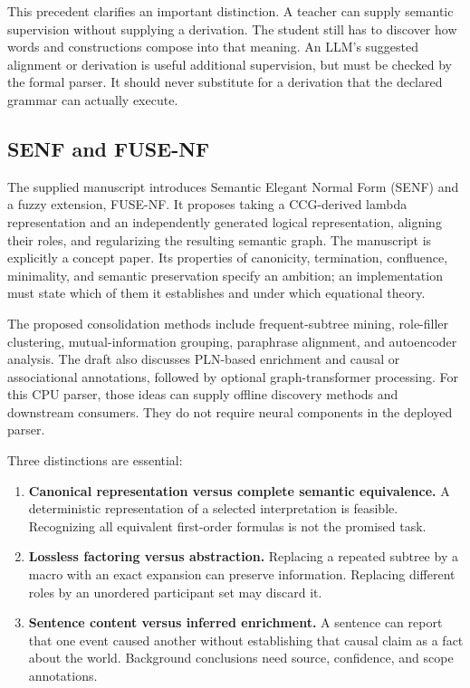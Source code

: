 \documentclass[11pt,a4paper]{article}
\begin{document}
This precedent clarifies an important distinction. A teacher can supply
semantic supervision without supplying a derivation. The student still has to
discover how words and constructions compose into that meaning. An LLM's
suggested alignment or derivation is useful additional supervision, but must
be checked by the formal parser. It should never substitute for a derivation
that the declared grammar can actually execute.

\subsection{SENF and FUSE-NF}
The supplied manuscript \cite{senf} introduces Semantic Elegant Normal Form
(SENF) and a fuzzy extension, FUSE-NF. It proposes taking a CCG-derived
lambda representation and an independently generated logical representation,
aligning their roles, and regularizing the resulting semantic graph.
The manuscript is explicitly a concept paper. Its properties of canonicity,
termination, confluence, minimality, and semantic preservation specify an
ambition; an implementation must state which of them it establishes and under
which equational theory.

The proposed consolidation methods include frequent-subtree mining,
role-filler clustering, mutual-information grouping, paraphrase alignment,
and autoencoder analysis. The draft also discusses PLN-based enrichment and
causal or associational annotations, followed by optional graph-transformer
processing. For this CPU parser, those ideas can supply offline discovery
methods and downstream consumers. They do not require neural components in
the deployed parser.

Three distinctions are essential:
\begin{enumerate}
  \item \textbf{Canonical representation versus complete semantic equivalence.}
  A deterministic representation of a selected interpretation is feasible.
  Recognizing all equivalent first-order formulas is not the promised task.
  \item \textbf{Lossless factoring versus abstraction.}
  Replacing a repeated subtree by a macro with an exact expansion can preserve
  information. Replacing different roles by an unordered participant set may
  discard it.
  \item \textbf{Sentence content versus inferred enrichment.}
  A sentence can report that one event caused another without establishing
  that causal claim as a fact about the world. Background conclusions need
  source, confidence, and scope annotations.
\end{enumerate}
\end{document}
